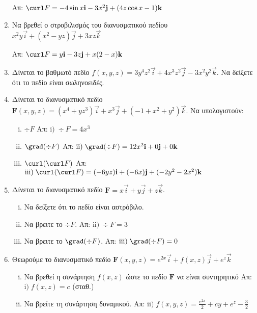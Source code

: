 \begin{enumerate}
    \hfill Απ: $\curl F=-4\sin x\vec{i}-3x^2\vec{j}+(4z\cos x-1)\vec{k}$

  \item Να βρεθεί ο στροβιλισμός του διανυσματικού πεδίου 
    $ x^2y\vec{i}+(x^2-yz)\vec{j}+3xz\vec{k} $

    \hfill Απ: $\curl F=y\vec{i}-3z\vec{j}+x(2-x)\vec{k}$

  \item Δίνεται το βαθμωτό πεδίο 
    $f(x,y,z)=3y^4z^2\vec{i}+4x^3z^2\vec{j}-3x^2y^2\vec{k}$. Να δείξετε ότι το 
    πεδίο είναι σωληνοειδές.

  \item Δίνεται το διανυσματικό πεδίο 
    $\boldsymbol{F}(x,y,z)=(x^4+yz^3)\vec{i}+x^3\vec{j}+(-1+x^2+y^2)\vec{k}$. 
    Να υπολογιστούν:
    \begin{enumerate}[i)]
      \item $\div F$ \hfill Απ: $\mathrm{i)}\; \div F=4x^3$ 
      \item $\grad(\div F)$ \hfill Απ:  
        $\mathrm{ii)}\; \grad(\div F)=12x^2\vec{i}+0\vec{j}+0\vec{k}$ 
      \item $\curl(\curl F)$
        \hfill Απ: 
        $\mathrm{iii)}\; \curl(\curl F)=(-6yz)\vec{i}+(-6x)\vec{j}+(-2y^2-2x^2)\vec{k}$

    \end{enumerate}

  \item Δίνεται το διανυσματικό πεδίο $\boldsymbol{F}=x\vec{i}+y\vec{j}+z\vec{k}$. 
    \begin{enumerate}[i)]
      \item Να δείξετε ότι το πεδίο είναι αστρόβιλο.
      \item Να βρειτε το $\div F$. \hfill Απ: $\mathrm{ii)}\; \div F=3$ 
      \item Να βρειτε το $\grad(\div F)$.
        \hfill Απ: $\mathrm{iii)}\; \grad(\div F)=0$
    \end{enumerate}



  \item Θεωρούμε το διανυσματικό πεδίο 
    $\boldsymbol{F}(x,y,z)=e^{2x}\vec{i}+f(x,z)\vec{j}+e^z\vec{k}$ 
    \begin{enumerate}[i)]
      \item Να βρεθεί η συνάρτηση $f(x,z)$ ώστε το πεδίο $ \bm{F} $ 
        να είναι συντηρητικό \hfill Απ:  $\mathrm{i)}\; f(x,z)=c$ (σταθ.)
      \item Να βρείτε τη συνάρτηση δυναμικού.
        \hfill Απ:  $\mathrm{ii)}\;f(x,y,z)=\frac{e^{2x}}{2}+cy+e^z-\frac{3}{2}$
    \end{enumerate}
\end{enumerate}


